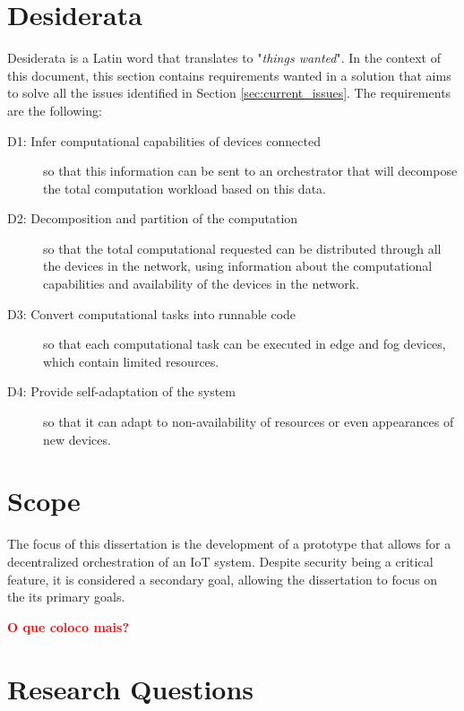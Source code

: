 \section{Desiderata}\label{sec:disiderata}

Desiderata is a Latin word that translates to "\emph{things wanted}". In the context of this document, this section contains requirements wanted in a solution that aims to solve all the issues identified in Section \ref{sec:current_issues}. The requirements are the following:

\begin{description}
    \item [D1: Infer computational capabilities of devices connected] so that this information can be sent to an orchestrator that will decompose the total computation workload based on this data.
    \item [D2: Decomposition and partition of the computation] so that the total computational requested can be distributed through all the devices in the network, using information about the computational capabilities and availability of the devices in the network.
    \item [D3: Convert computational tasks into runnable code] so that each computational task can be executed in edge and fog devices, which contain limited resources.
    \item [D4: Provide self-adaptation of the system] so that it can adapt to non-availability of resources or even appearances of new devices.
\end{description}

\section{Scope}\label{sec:scope}

The focus of this dissertation is the development of a prototype that allows for a decentralized orchestration of an IoT system. Despite security being a critical feature, it is considered a secondary goal, allowing the dissertation to focus on the its primary goals.

\textcolor{red}{\textbf{O que coloco mais?}}


\section{Research Questions}\label{sec:stat_research_questions}

